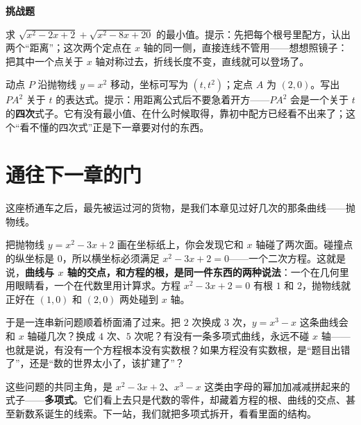 \textbf{挑战题}

\begin{sikao}
\item 求 $\sqrt{x^{2}-2x+2}+\sqrt{x^{2}-8x+20}$ 的最小值。提示：先把每个根号里配方，认出两个“距离”；这次两个定点在 $x$ 轴的同一侧，直接连线不管用——想想照镜子：把其中一个点关于 $x$ 轴对称过去，折线长度不变，直线就可以登场了。
\item 动点 $P$ 沿抛物线 $y=x^{2}$ 移动，坐标可写为 $(t,t^{2})$；定点 $A$ 为 $(2,0)$。写出 $PA^{2}$ 关于 $t$ 的表达式。提示：用距离公式后不要急着开方——$PA^{2}$ 会是一个关于 $t$ 的\textbf{四次}式子。它有没有最小值、在什么时候取得，靠初中配方已经看不出来了；这个“看不懂的四次式”正是下一章要对付的东西。
\end{sikao}

\section*{通往下一章的门}

这座桥通车之后，最先被运过河的货物，是我们本章见过好几次的那条曲线——抛物线。

把抛物线 $y=x^{2}-3x+2$ 画在坐标纸上，你会发现它和 $x$ 轴碰了两次面。碰撞点的纵坐标是 $0$，所以横坐标必须满足 $x^{2}-3x+2=0$——一个二次方程。这就是说，\textbf{曲线与 $x$ 轴的交点，和方程的根，是同一件东西的两种说法}：一个在几何里用眼睛看，一个在代数里用计算求。方程 $x^{2}-3x+2=0$ 有根 $1$ 和 $2$，抛物线就正好在 $(1,0)$ 和 $(2,0)$ 两处碰到 $x$ 轴。

于是一连串新问题顺着桥面涌了过来。把 $2$ 次换成 $3$ 次，$y=x^{3}-x$ 这条曲线会和 $x$ 轴碰几次？换成 $4$ 次、$5$ 次呢？有没有一条多项式曲线，永远不碰 $x$ 轴——也就是说，有没有一个方程根本没有实数根？如果方程没有实数根，是“题目出错了”，还是“数的世界太小了，该扩建了”？

这些问题的共同主角，是 $x^{2}-3x+2$、$x^{3}-x$ 这类由字母的幂加加减减拼起来的式子——\textbf{多项式}。它们看上去只是代数的零件，却藏着方程的根、曲线的交点、甚至新数系诞生的线索。下一站，我们就把多项式拆开，看看里面的结构。
